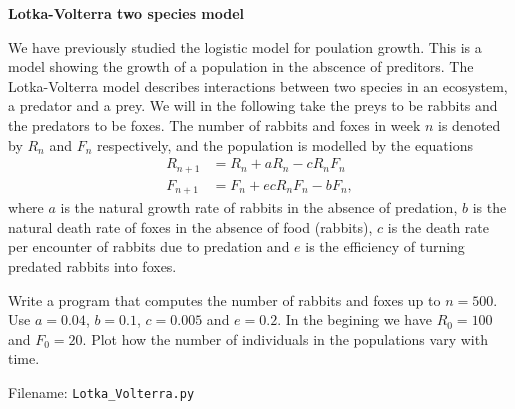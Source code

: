 \begin{Problem}{\textbf{Lotka-Volterra two species model}}

\noindent We have previously studied the logistic model for poulation growth. This is a
model showing the growth of a population in the abscence of preditors. The
Lotka-Volterra model describes interactions between two species in an ecosystem,
a predator and a prey. We will in the following take the preys to be rabbits and the
predators to be foxes. The number of rabbits and foxes in week $n$ is denoted by
$R_n$ and $F_n$ respectively, and the population is modelled by the equations
\begin{align*}
R_{n+1} &= R_n + aR_n - cR_nF_n\\
F_{n+1} &= F_n + ecR_nF_n - bF_n,
\end{align*}
where $a$ is the natural growth rate of rabbits in the absence of predation, $b$ is
the natural death rate of foxes in the absence of food (rabbits), $c$ is the death
rate per encounter of rabbits due to predation and $e$ is the efficiency of turning
predated rabbits into foxes.

Write a program that computes the number of rabbits and foxes up to $n = 500$.
Use $a = 0.04$, $b = 0.1$, $c = 0.005$ and $e = 0.2$. In the begining we have
$R_0 = 100$ and $F_0 = 20$. Plot how the number of individuals in the populations
vary with time.

Filename: \texttt{Lotka\_Volterra.py}
\end{Problem}

